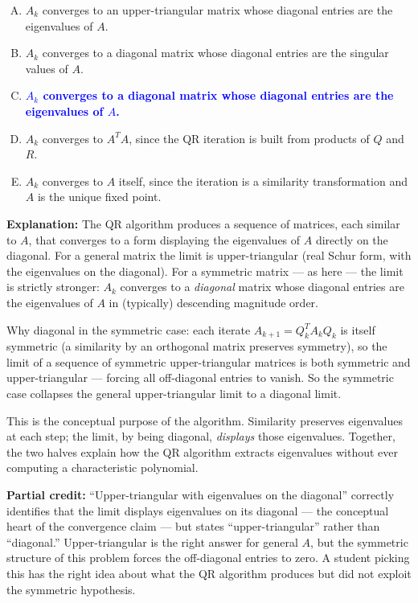 \documentclass[12pt]{amsart}
\begin{document}
\begin{enumerate}[(A)]
\item $A_k$ converges to an upper-triangular matrix whose diagonal entries are the eigenvalues of $A$.
\item $A_k$ converges to a diagonal matrix whose diagonal entries are the singular values of $A$.
\item \textcolor{blue}{\textbf{$A_k$ converges to a diagonal matrix whose diagonal entries are the eigenvalues of $A$.}}
\item $A_k$ converges to $A^T A$, since the QR iteration is built from products of $Q$ and $R$.
\item $A_k$ converges to $A$ itself, since the iteration is a similarity transformation and $A$ is the unique fixed point.
\end{enumerate}

\textbf{Explanation:}
The QR algorithm produces a sequence of matrices, each similar to $A$, that
converges to a form displaying the eigenvalues of $A$ directly on the
diagonal. For a general matrix the limit is upper-triangular (real Schur
form, with the eigenvalues on the diagonal). For a symmetric matrix --- as
here --- the limit is strictly stronger: $A_k$ converges to a \emph{diagonal}
matrix whose diagonal entries are the eigenvalues of $A$ in (typically)
descending magnitude order.

Why diagonal in the symmetric case: each iterate $A_{k+1} = Q_k^T A_k Q_k$
is itself symmetric (a similarity by an orthogonal matrix preserves
symmetry), so the limit of a sequence of symmetric upper-triangular matrices
is both symmetric and upper-triangular --- forcing all off-diagonal entries
to vanish. So the symmetric case collapses the general upper-triangular
limit to a diagonal limit.

This is the conceptual purpose of the algorithm. Similarity preserves
eigenvalues at each step; the limit, by being diagonal, \emph{displays}
those eigenvalues. Together, the two halves explain how the QR algorithm
extracts eigenvalues without ever computing a characteristic polynomial.

\textbf{Partial credit:}
``Upper-triangular with eigenvalues on the diagonal'' correctly identifies
that the limit displays eigenvalues on its diagonal --- the conceptual
heart of the convergence claim --- but states ``upper-triangular'' rather
than ``diagonal.'' Upper-triangular is the right answer for general $A$,
but the symmetric structure of this problem forces the off-diagonal entries
to zero. A student picking this has the right idea about what the QR
algorithm produces but did not exploit the symmetric hypothesis.
\end{document}
